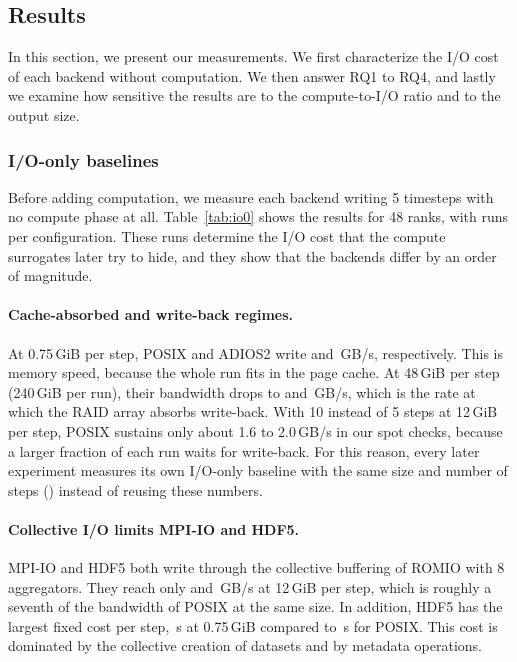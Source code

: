 \subsection{Results}
\label{sec:results}

In this section, we present our measurements. We first characterize the I/O
cost of each backend without computation. We then answer RQ1 to RQ4, and
lastly we examine how sensitive the results are to the compute-to-I/O ratio
and to the output size.

\subsubsection{I/O-only baselines}
\label{sec:io0}

Before adding computation, we measure each backend writing 5 timesteps with
no compute phase at all. Table~\ref{tab:io0} shows the results for 48 ranks,
with \IonPosixMd runs per configuration. These runs determine the I/O cost
that the compute surrogates later try to hide, and they show that the
backends differ by an order of magnitude.

\paragraph{Cache-absorbed and write-back regimes.} At 0.75\,GiB per step,
POSIX and ADIOS2 write \IobwPosixXs and \IobwAdiosXs\,GB/s, respectively. This
is memory speed, because the whole run fits in the page cache. At 48\,GiB
per step (240\,GiB per run), their bandwidth drops to \IobwPosixLg and
\IobwAdiosLg\,GB/s, which is the rate at which the RAID array absorbs
write-back. With 10 instead of 5 steps at 12\,GiB per step, POSIX sustains
only about 1.6 to 2.0\,GB/s in our spot checks, because a larger fraction of
each run waits for write-back. For this reason, every later experiment
measures its own I/O-only baseline with the same size and number of steps
(\srcIoBaseline) instead of reusing these numbers.

\paragraph{Collective I/O limits MPI-IO and HDF5.} MPI-IO and HDF5 both write
through the collective buffering of ROMIO with 8 aggregators. They reach only
\IobwMpiioMd and \IobwHdfMd\,GB/s at 12\,GiB per step, which is roughly a
seventh of the bandwidth of POSIX at the same size. In addition, HDF5 has the
largest fixed cost per step, \IosyncHdfXs\,s at 0.75\,GiB compared to
\IosyncPosixXs\,s for POSIX. This cost is dominated by the collective
creation of datasets and by metadata operations.

